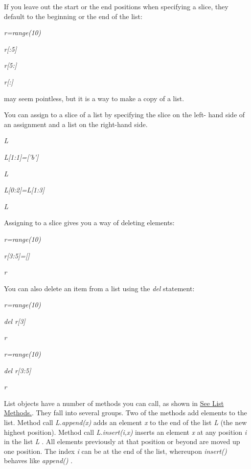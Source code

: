 If you leave out the start or the
end positions when specifying a slice, they default to the beginning or
the end of the list:


\emph{r=range(10)}


\emph{r{[}:5{]}}




\emph{r{[}5:{]}}




\emph{r{[}:{]}}



 may seem
pointless, but it is a way to make a copy of a list.

You can assign to a slice of a list
by specifying the slice on the left- hand side of an assignment and a
list on the right-hand side.


\emph{L}




\emph{L{[}1:1{]}={[}'b'{]}}


\emph{L}




\emph{L{[}0:2{]}=L{[}1:3{]}}


\emph{L}



Assigning to a slice gives you a
way of deleting elements:


\emph{r=range(10)}


\emph{r{[}3:5{]}={[}{]}}


\emph{r}



You can also delete an item from a
list using the \emph{del} statement:


\emph{r=range(10)}


\emph{del r{[}3{]}}


\emph{r}




\emph{r=range(10)}


\emph{del r{[}3:5{]}}


\emph{r}



List objects have a number of
methods you can call, as shown in \href{chap2.html\#20881}{See List
Methods.}. They fall into several groups. Two of the methods add
elements to the list. Method call \emph{L.append(x)} adds an element
\emph{x} to the end of the list \emph{L} (the new highest position).
Method call \emph{L.insert(i,x)} inserts an element \emph{x} at any
position \emph{i} in the list \emph{L} . All elements previously at that
position or beyond are moved up one position. The index \emph{i} can be
at the end of the list, whereupon \emph{insert()} behaves like
\emph{append()} .

